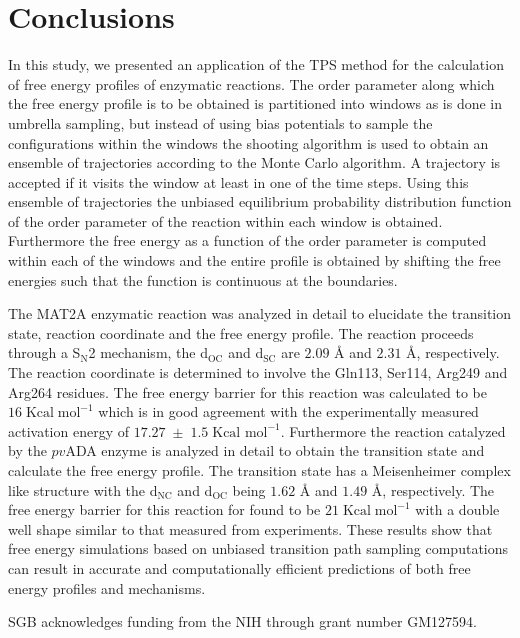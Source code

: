 \documentclass[journal=jpcbfk,manuscript=article,layout=traditional]{achemso}
\begin{document}
\section{Conclusions}
In this study, we presented an application of the TPS method for the calculation 
of free energy profiles of enzymatic reactions. The order parameter along which the 
free energy profile is to be obtained is partitioned into windows as is done in 
umbrella sampling, but instead of using bias potentials to sample the configurations
within the windows the shooting algorithm is used to
obtain an ensemble of trajectories according to the Monte Carlo algorithm. A 
trajectory is accepted if it visits the window at least in one of the time steps. 
Using this ensemble of trajectories the unbiased equilibrium probability distribution 
function of the order parameter of the reaction within each window is obtained.
Furthermore the free energy as a function of the order parameter is computed within 
each of the windows and the entire profile is obtained by shifting the free energies
such that the function is continuous at the boundaries.   

The MAT2A enzymatic reaction was analyzed in detail to elucidate the transition state,
reaction coordinate and the free energy profile. The reaction proceeds through a 
S$_\text{N}$2 mechanism, the d$_{\text{OC}}$ and d$_{\text{SC}}$ are $2.09$ {\AA}
and $2.31$ {\AA}, respectively. The reaction coordinate is determined to involve  
the Gln113, Ser114, Arg249 and Arg264 residues. 
The free energy barrier for this reaction was calculated to be 
$16\;\text{Kcal}\;\text{mol}^{-1}$ which is in good agreement 
with the experimentally measured activation energy of $17.27\;\pm\;1.5\;\text{Kcal mol}^{-1}$. 
Furthermore the reaction catalyzed by the $pv$ADA enzyme is analyzed in detail to obtain the  
transition state and calculate the free energy profile.
The transition state has a Meisenheimer complex like structure with the 
d$_\text{NC}$ and d$_\text{OC}$ being $1.62$ {\AA} and $1.49$ {\AA}, respectively.
The free energy barrier for this reaction for found to be $21\;\text{Kcal}\;\text{mol}^{-1}$
with a double well shape similar to that measured from experiments. 
These results show that free energy simulations based on unbiased transition 
path sampling computations can result in accurate and computationally
efficient predictions of both free energy profiles and mechanisms.  
\begin{acknowledgement}
SGB acknowledges funding from the NIH through grant number GM127594.
\end{acknowledgement}
\end{document}
